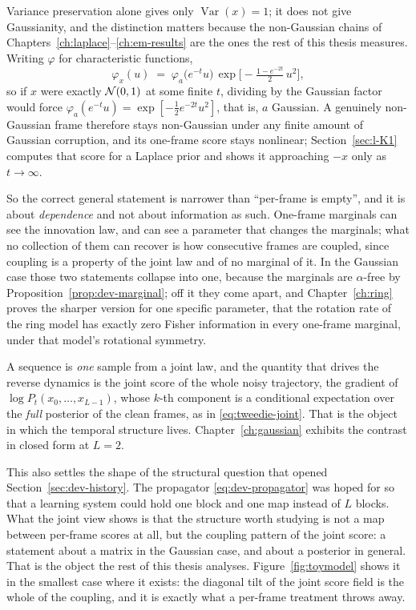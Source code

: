 \begin{remark}\label{rmk:dev-nongaussian}
Variance preservation alone gives only $\operatorname{Var}(x) = 1$; it does not give
Gaussianity, and the distinction matters because the non-Gaussian chains of
Chapters~\ref{ch:laplace}--\ref{ch:em-results} are the ones the rest of this
thesis measures. Writing $\varphi$ for characteristic functions,
\begin{equation}
  \varphi_{x}(u) \;=\; \varphi_a\!\big(e^{-t}u\big)\,
  \exp\!\Big[-\tfrac{1 - e^{-2t}}{2}\,u^2\Big],
  \label{eq:dev-cf}
\end{equation}
so if $x$ were exactly $\mathcal{N}(0,1)$ at some finite $t$, dividing by the Gaussian
factor would force
$\varphi_a(e^{-t}u) = \exp[-\tfrac{1}{2}e^{-2t}u^2]$, that is, $a$ Gaussian.
A genuinely non-Gaussian frame therefore stays non-Gaussian under any finite
amount of Gaussian corruption, and its one-frame score stays nonlinear;
Section~\ref{sec:l-K1} computes that score for a Laplace prior and shows it
approaching $-x$ only as $t \to \infty$.
\end{remark}

\noindent So the correct general statement is narrower than
``per-frame is empty'', and it is about \emph{dependence} and not about
information as such. One-frame marginals can see the innovation law, and can
see a parameter that changes the marginals; what no collection of them can
recover is how consecutive frames are coupled, since coupling is a property of
the joint law and of no marginal of it. In the Gaussian case those two
statements collapse into one, because the marginals are $\alpha$-free by
Proposition~\ref{prop:dev-marginal}; off it they come apart, and
Chapter~\ref{ch:ring} proves the sharper version for one specific parameter, that the rotation rate of the ring model has exactly zero Fisher information in
every one-frame marginal, under that model's rotational symmetry.

A sequence is \emph{one} sample from a joint law, and the quantity that
drives the reverse dynamics is the joint score of the whole noisy trajectory,
the gradient of $\log P_t(x_0, \dots, x_{L-1})$, whose $k$-th component is a
conditional expectation over the \emph{full} posterior of the clean frames,
as in \eqref{eq:tweedie-joint}. That is the object in which the temporal
structure lives. Chapter~\ref{ch:gaussian} exhibits the contrast in closed form
at $L = 2$.

This also settles the shape of the structural question that opened
Section~\ref{sec:dev-history}. The propagator \eqref{eq:dev-propagator} was
hoped for so that a learning system could hold one block and one map instead of
$L$ blocks. What the joint view shows is that the structure worth studying is
not a map between per-frame scores at all, but the coupling pattern of the
joint score: a statement about a matrix in the Gaussian case, and about a
posterior in general. That is the object the rest of this thesis analyses.
Figure~\ref{fig:toymodel} shows it in the smallest case where it exists: the
diagonal tilt of the joint score field is the whole of the coupling, and it is
exactly what a per-frame treatment throws away.

